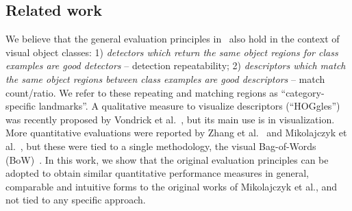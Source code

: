 \documentclass[10pt,journal,cspaper,compsoc]{IEEEtran}
\begin{document}
%
\subsection{Related work}
%


We believe that the general evaluation principles in~\cite{MikTuySch:2005,MikSch:2005} also hold in
the context of visual object classes: 1) \textit{detectors which return the same object regions for class
examples are good detectors} -- detection repeatability; 2)
\textit{descriptors which match the same object regions between class examples are good descriptors} -- match count/ratio. We refer to these repeating and matching regions as
``category-specific landmarks''. A qualitative measure to visualize
descriptors (``HOGgles'') was recently proposed by Vondrick et al.~\cite{VonKhoMal:2013},
but its main use is in visualization. More
quantitative evaluations were reported by Zhang et al.~\cite{ZhaMarLaz:2006}
and Mikolajczyk et al.~\cite{MikLeiSch:2005}, but these were
tied to a single methodology, the visual
Bag-of-Words (BoW)~\cite{SivZis:2003,CsuDanWil:2004}.
In this work, we show that the original evaluation principles can 
be adopted to obtain similar quantitative performance measures in general,
comparable and intuitive forms to the original works of Mikolajczyk et al., and not
tied to any specific approach.

\end{document}
